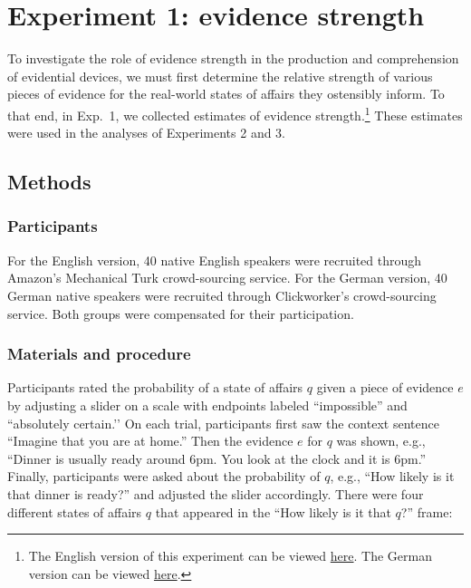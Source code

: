 \documentclass[11pt]{article}
\begin{document}
\section{Experiment 1: evidence strength}

To investigate the role of evidence strength in the production and comprehension of evidential devices, we must first determine the relative strength of various pieces of evidence for the real-world states of affairs they ostensibly inform. To that end, in Exp.~1, we collected estimates of evidence strength.\footnote{The English version of this experiment can be viewed \href{https://web.stanford.edu/~justinek/modals_exp/evidence.html}{here}. The German version can be viewed \href{http://web.stanford.edu/~jdegen/cgi-bin/4_dp_priors_evidencestrength/evidence.html}{here}.} These estimates were used in the analyses of Experiments 2 and 3.

\subsection{Methods}

\subsubsection{Participants}

For the English version, 40 native English speakers were recruited through Amazon's Mechanical Turk crowd-sourcing service. For the German version, 40 German native speakers were recruited through Clickworker's crowd-sourcing service. Both groups were compensated for their participation.

\subsubsection{Materials and procedure}

Participants rated the probability of a state of affairs $q$ given a piece of evidence $e$ by adjusting a slider on a scale with endpoints labeled ``impossible'' and ``absolutely certain.’’ On each trial, participants first saw the context sentence ``Imagine that you are at home.'' Then the evidence $e$ for $q$ was shown, e.g., ``Dinner is usually ready around 6pm. You look at the clock and it is 6pm.'' Finally, participants were asked about the probability of $q$, e.g., ``How likely is it that dinner is ready?'' and adjusted the slider accordingly. There were four different states of affairs $q$ that appeared in the ``How likely is it that $q$?'' frame:
\end{document}
